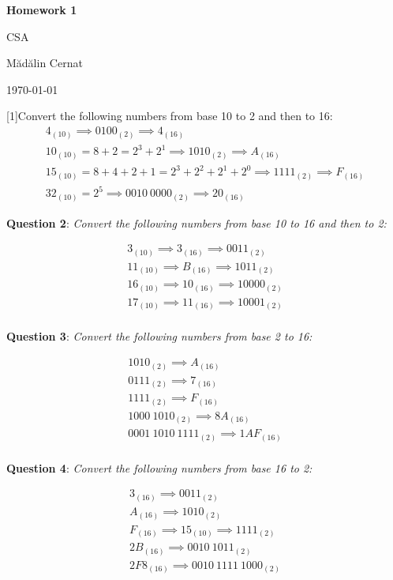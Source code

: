 \documentclass{article}
\newcommand{\question}[2][]{\begin{flushleft}
        \textbf{Question #1}: \textit{#2}


\end{flushleft}}
\newcommand{\maketitletwo}[2][]{\begin{center}
        \Large{\textbf{Homework 1}
            
            CSA}
        \vspace{5pt}
        
        \normalsize{Mădălin Cernat
        
        \today}     
        \vspace{15pt}
        
\end{center}}
\begin{document}
    \maketitletwo[5]
    
    	\question[1]{Convert the following numbers from base 10 to 2 and then to 16:} 
	\begin{gather*}
	  4_{(10)} \implies  0100_{(2)} \implies 4_{(16)}\\
	  10_{(10)} = 8 + 2 = 2^3 + 2^1 \implies 1010_{(2)} \implies A_{(16)}\\
	  15_{(10)} = 8 + 4 + 2 + 1 = 2^3 + 2^2 + 2^1 + 2^0 \implies 1111_{(2)} \implies F_{(16)}\\
	  32_{(10)} = 2^5 \implies 0010\ 0000_{(2)} \implies 20_{(16)}
	\end{gather*}
    
    	\question[2]{Convert the following numbers from base 10 to 16 and then to 2:}
   	\begin{gather*}
		3_{(10)} \implies 3_{(16)} \implies 0011_{(2)}\\
		11_{(10)} \implies B_{(16)} \implies 1011_{(2)}\\
		16_{(10)} \implies 10_{(16)} \implies 10000_{(2)}\\
		17_{(10)} \implies 11_{(16)} \implies 10001_{(2)}\\
	\end{gather*}
    
    	\question[3]{Convert the following numbers from base 2 to 16:}
	\begin{gather*}
		1010_{(2)} \implies A_{(16)}\\
		0111_{(2)} \implies 7_{(16)}\\
		1111_{(2)} \implies F_{(16)}\\
		1000\ 1010_{(2)} \implies 8A_{(16)}\\
		0001\ 1010\ 1111_{(2)} \implies 1AF_{(16)}\\
	\end{gather*}
	\newpage

	\question[4]{Convert the following numbers from base 16 to 2:}
	
	\begin{gather*}
		3_{(16)} \implies 0011_{(2)}\\
		A_{(16)} \implies 1010_{(2)}\\
		F_{(16)} \implies 15_{(10)} \implies 1111_{(2)}\\
		2B_{(16)} \implies 0010\ 1011_{(2)}\\
		2F8_{(16)} \implies 0010\ 1111\ 1000_{(2)}\\
	\end{gather*}
\end{document}
